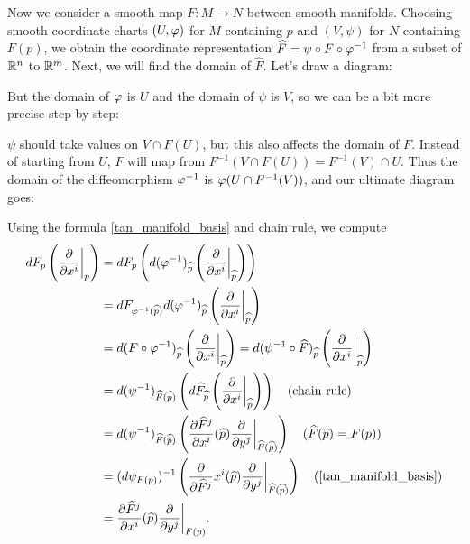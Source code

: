 Now we consider a smooth map $F:M \to N$ between smooth manifolds. Choosing smooth coordinate charts $(U,\varphi)$ for $M$ containing $p$ and $(V,\psi)$ for $N$ containing $F(p)$, we obtain the coordinate representation $\widehat{F} = \psi \circ F \circ \varphi^{-1}$ from a subset of $\mathbb{R}^n$ to $\mathbb{R}^m$. 
Next, we will find the domain of $\hat{F}$. Let's draw a diagram:
\begin{center}
\end{center}
But the domain of $\varphi$ is $U$ and the domain of $\psi$ is $V$, so we can be a bit more precise step by step:
\begin{center}
\end{center} 
$\psi$ should take values on $V \cap F(U)$, but this also affects the domain of $F$. Instead of starting from $U$, $F$ will map from $F^{-1}(V \cap F(U)) = F^{-1}(V) \cap U$. Thus the domain of the diffeomorphism $\varphi^{-1}$ is $\varphi(U \cap F^{-1}(V))$, and our ultimate diagram goes:
\begin{center}
\end{center} 
Using the formula \ref{tan_manifold_basis} and chain rule, we compute 
\begin{align*}
    dF_p\left(\pdv{}{x^i}\bigg|_p\right)
    &= dF_p \left(d(\varphi^{-1})_{\widehat{p}}\left(\pdv{}{x^i}\bigg|_{\widehat{p}} \right) \right) \\
    &= dF_{\varphi^{-1}(\widehat{p})} d(\varphi^{-1})_{\widehat{p}} \left(\pdv{}{x^i}\bigg|_{\widehat{p}} \right) \\
    &= d(F \circ \varphi^{-1})_{\widehat{p}} \left(\pdv{}{x^i}\bigg|_{\widehat{p}} \right) 
     = d(\psi^{-1} \circ \widehat{F})_{\widehat{p}} \left(\pdv{}{x^i}\bigg|_{\widehat{p}} \right) \\
    &= d(\psi^{-1})_{\widehat{F}(\widehat{p})}\left(d\widehat{F}_{\widehat{p}} \left(\pdv{}{x^i}\bigg|_{\widehat{p}} \right) \right) \quad (\text{chain rule}) \\
    &= d(\psi^{-1})_{\widehat{F}(\widehat{p})} \left(  {\pdv{\widehat{F}^j}{x^i}}(\widehat{p}) \pdv{}{y^j}\bigg|_{\widehat{F}(\widehat{p})}  \right) \quad (\widehat{F}(\widehat{p}) = F(p)) \\
    &= (d\psi_{F(p)})^{-1} \left(  {\pdv{\widehat{F}^j}}{x^i}(\widehat{p}) \pdv{}{y^j}\bigg|_{\widehat{F}(\widehat{p})}  \right) \quad (\ref{tan_manifold_basis}) \\
    &= {\pdv{\widehat{F}^j}{x^i}} (\widehat{p}) \pdv{}{y^j} \bigg|_{F(p)}.
\end{align*}

